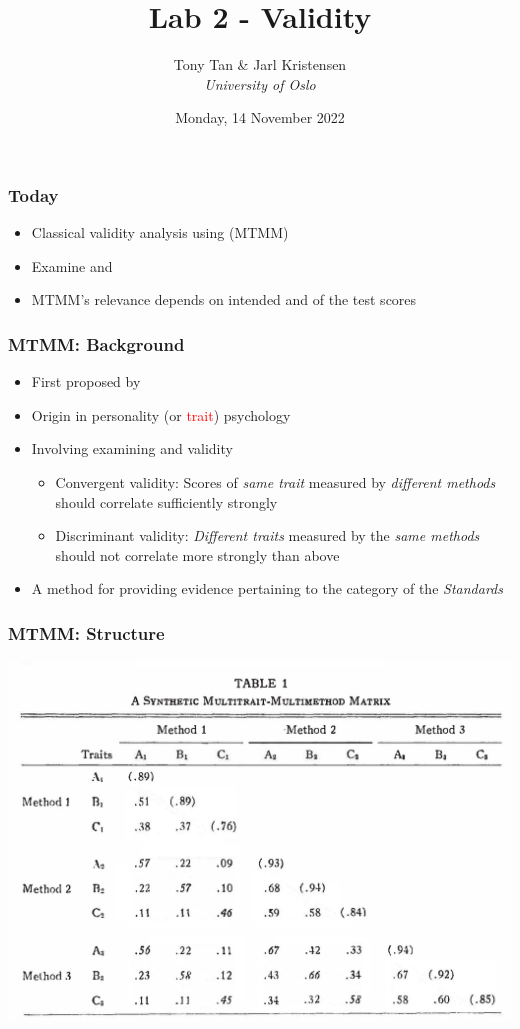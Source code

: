 \documentclass[compress,dvipsnames]{beamer}\usepackage[]{graphicx}\usepackage[]{xcolor}
\title{Lab 2 - Validity}
\author[]{Tony Tan \& Jarl Kristensen \\\vspace{6pt} {\em{University of Oslo}} }
\date{Monday, 14 November 2022}
\begin{document}
\begin{frame}[fragile]
\titlepage
\end{frame}


\begin{frame}[fragile]
	\frametitle{Today}
		\begin{itemize}
			\item Classical validity analysis using  (MTMM)
			\item Examine  and 
			\item MTMM's relevance depends on intended  and  of the test scores
		\end{itemize}
\end{frame}


\begin{frame}[fragile]
	\frametitle{MTMM: Background}
		\begin{itemize}
			\item First proposed by \textcite{campbell:1959}
			\item Origin in personality (or \textcolor{red}{trait})	psychology
			\item Involving examining  and  validity
				\begin{itemize}
					\item Convergent validity: Scores of \emph{same trait} measured by \emph{different methods} should correlate sufficiently strongly
					\item Discriminant validity: \emph{Different traits} measured by the \emph{same methods} should not correlate more strongly than above
				\end{itemize}
			\item A method for providing evidence pertaining to the  category of the \textit{Standards} \parencite{standards:2014}
		\end{itemize}
\end{frame}

\begin{frame}[fragile]
	\frametitle{MTMM: Structure}
	\includegraphics[width=\textwidth]{MTMM.jpg}
\end{frame}
\end{document}
